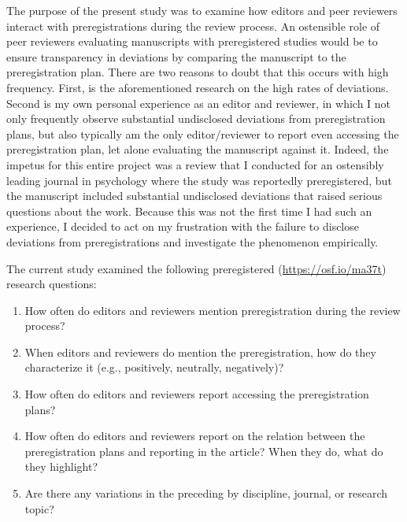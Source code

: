 \documentclass[authordate, meta, issue]{jote-new-article}
\begin{document}
	The purpose of the present study was to examine how editors and peer reviewers interact with preregistrations during the review process. An ostensible role of peer reviewers evaluating manuscripts with preregistered studies would be to ensure transparency in deviations by comparing the manuscript to the preregistration plan. There are two reasons to doubt that this occurs with high frequency. First, is the aforementioned research on the high rates of deviations. Second is my own personal experience as an editor and reviewer, in which I not only frequently observe substantial undisclosed deviations from preregistration plans, but also typically am the only editor/reviewer to report even accessing the preregistration plan, let alone evaluating the manuscript against it. Indeed, the impetus for this entire project was a review that I conducted for an ostensibly leading journal in psychology where the study was reportedly preregistered, but the manuscript included substantial undisclosed deviations that raised serious questions about the work. Because this was not the first time I had such an experience, I decided to act on my frustration with the failure to disclose deviations from preregistrations and investigate the phenomenon empirically.



	The current study examined the following preregistered (\url{https://osf.io/ma37t}) research questions:

	\begin{enumerate}


		\item How often do editors and reviewers mention preregistration during the review process?



		\item
		When editors and reviewers do mention the preregistration, how do they characterize it (e.g., positively, neutrally, negatively)?



		\item How often do editors and reviewers report accessing the preregistration plans?



		\item
		How often do editors and reviewers report on the relation between the preregistration plans and reporting in the article? When they do, what do they highlight?



		\item Are there any variations in the preceding by discipline, journal, or research topic?


	\end{enumerate}
\end{document}
